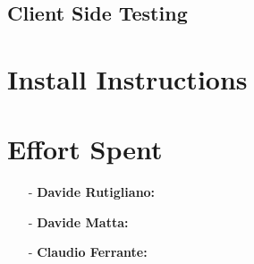 \documentclass[a4paper]{article}
\begin{document}
\subsection{Client Side Testing}

\newpage
\section{Install Instructions}

\newpage
\section{Effort Spent}
    \begin{itemize}
        \item[-] \textbf{Davide Rutigliano: }
        
        \item[-] \textbf{Davide Matta: }
        
        \item[-] \textbf{Claudio Ferrante: }
    \end{itemize}
\end{document}
